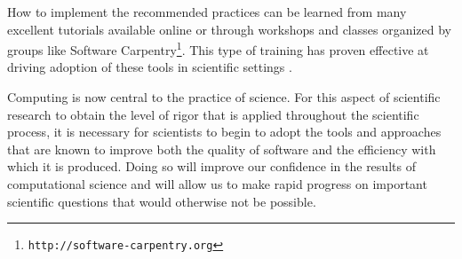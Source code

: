 \documentclass{article}
\newcommand{\footurl}[1]{\footnote{\texttt{#1}}}
\begin{document}
How to implement the recommended practices can be learned from many
excellent tutorials available online or through workshops and classes
organized by groups like Software
Carpentry\footurl{http://software-carpentry.org}. This type of
training has proven effective at driving adoption of these tools in
scientific settings \cite{aranda2012}.

Computing is now central to the practice of science. For this aspect
of scientific research to obtain the level of rigor that is applied
throughout the scientific process, it is necessary for scientists to
begin to adopt the tools and approaches that are known to improve both
the quality of software and the efficiency with which it is
produced. Doing so will improve our confidence in the results of
computational science and will allow us to make rapid progress on
important scientific questions that would otherwise not be possible.



\end{document}
